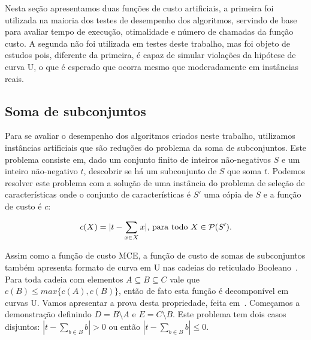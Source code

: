 Nesta seção apresentamos duas funções de custo artificiais, a primeira 
foi utilizada na maioria dos testes de desempenho dos algoritmos, 
servindo de base para avaliar tempo de execução, otimalidade e número de 
chamadas da função custo. A segunda não foi utilizada em testes deste
trabalho, mas foi objeto de estudos pois, diferente da primeira, é capaz
de simular violações da hipótese de curva U, o que é esperado que ocorra
mesmo que moderadamente em instâncias reais.

\subsection{Soma de subconjuntos}
Para se avaliar o desempenho dos algoritmos criados neste trabalho, 
utilizamos instâncias artificiais que são reduções do problema da soma
de subconjuntos. Este problema consiste em, dado um conjunto finito de
inteiros não-negativos $S$ e um inteiro não-negativo $t$, descobrir se
há um subconjunto de $S$ que soma $t$. Podemos resolver este problema 
com a solução de uma instância do problema de seleção de características
onde o conjunto de características é $S'$ uma cópia de $S$ e a função de
custo é $c$:

\begin{equation} \label{cost_function:subset_sum}
    c (X) = |t - \sum_{x \in X} x| \text{, para todo } 
                                        X \in \mathcal{P}(S') \text{.}
\end{equation}

Assim como a função de custo MCE, a função de custo de somas de 
subconjuntos também apresenta formato de curva em U nas cadeias
do reticulado Booleano~\cite{Rei12}. Para toda cadeia com elementos 
$A \subseteq B 
\subseteq C$ vale que $c (B) \leq max\{c (A), c (B)\}$, então de fato 
esta função é decomponível em curvas U. Vamos apresentar a prova desta propriedade, feita em~\cite{Rei12}. Começamos a 
demonstração definindo $D = B \setminus A$ e $E = C \setminus B$. Este problema tem dois casos disjuntos:  $|t - \sum_{b \in B}
b| > 0$ ou então $|t - \sum_{b \in B} b| \leq 0$.  

